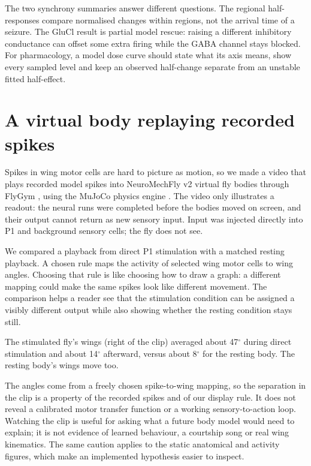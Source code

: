 \documentclass[11pt]{article}
\begin{document}
The two synchrony summaries answer different questions. The regional half-responses compare normalised changes within regions, not the arrival time of a seizure. The GluCl result is partial model rescue: raising a different inhibitory conductance can offset some extra firing while the GABA channel stays blocked. For pharmacology, a model dose curve should state what its axis means, show every sampled level and keep an observed half-change separate from an unstable fitted half-effect.

\section*{A virtual body replaying recorded spikes}
Spikes in wing motor cells are hard to picture as motion, so we made a video that plays recorded model spikes into NeuroMechFly v2 virtual fly bodies through FlyGym \cite{wangchen}, using the MuJoCo physics engine \cite{mujoco}. The video only illustrates a readout: the neural runs were completed before the bodies moved on screen, and their output cannot return as new sensory input. Input was injected directly into P1 and background sensory cells; the fly does not see.

We compared a playback from direct P1 stimulation with a matched resting playback. A chosen rule maps the activity of selected wing motor cells to wing angles. Choosing that rule is like choosing how to draw a graph: a different mapping could make the same spikes look like different movement. The comparison helps a reader see that the stimulation condition can be assigned a visibly different output while also showing whether the resting condition stays still.

The stimulated fly's wings (right of the clip) averaged about 47$^\circ$ during direct stimulation and about 14$^\circ$ afterward, versus about 8$^\circ$ for the resting body. The resting body's wings move too.

The angles come from a freely chosen spike-to-wing mapping, so the separation in the clip is a property of the recorded spikes and of our display rule. It does not reveal a calibrated motor transfer function or a working sensory-to-action loop. Watching the clip is useful for asking what a future body model would need to explain; it is not evidence of learned behaviour, a courtship song or real wing kinematics. The same caution applies to the static anatomical and activity figures, which make an implemented hypothesis easier to inspect.
\end{document}

